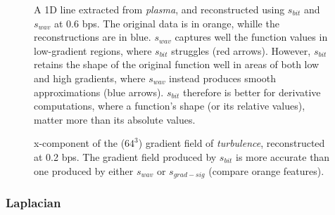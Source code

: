 \begin{figure}[t]
	\centering
	\caption{A 1D line extracted from \emph{plasma}, and reconstructed using $s_{bit}$ and $s_{wav}$ at
	0.6 bps. The original data is in orange, whille the reconstructions are in blue. $s_{wav}$ captures
	well the function values in low-gradient regions, where $s_{bit}$ struggles (red arrows).
	However, $s_{bit}$ retains the shape of the original function well in areas of both low and high
	gradients, where $s_{wav}$ instead produces smooth approximations (blue arrows). $s_{bit}$
	therefore is better for	derivative computations, where a function's shape (or its relative
	values), matter more than its absolute values.}\label{fig:bit-plane-vs-wavelet-norm-gradient}
\end{figure}

\begin{figure}[t]
	\centering
	\caption{x-component of the ($64^3$) gradient field of \emph{turbulence}, reconstructed at 0.2
	bps. The gradient field produced by $s_{bit}$ is more accurate than one produced by either
	$s_{wav}$ or $s_{grad-sig}$ (compare orange features).}\label{fig:gradient-rendering-diff}
\end{figure}

\subsubsection{Laplacian}\label{sec:laplacian}

